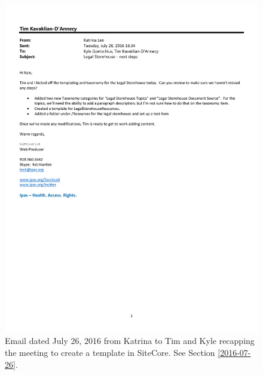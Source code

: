 \begin{figure}
  \centering
  \noindent\includegraphics[page=1,angle=-90,origin=c,width=.75\textwidth,height=.75\textheight]{documents/2016-07-26-Email-Katrina-Kyle-Tim}
 \caption{Email dated July 26, 2016 from Katrina to Tim and Kyle recapping the meeting to create a template in SiteCore. See Section \protect\ref{2016-07-26}.}
 \label{fig:2016-07-26-Email-Katrina-Kyle-Tim}
\end{figure}

